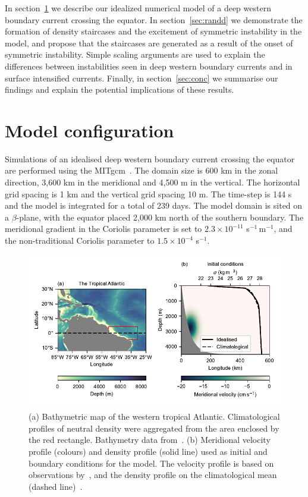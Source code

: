 In section~\ref{sec:methods} we describe our idealized numerical model of a deep western boundary current crossing the equator. In section~\ref{sec:randd} we demonstrate the formation of density staircases and the excitement of symmetric instability in the model, and propose that the staircases are generated as a result of the onset of symmetric instability. Simple scaling arguments are used to explain the differences between instabilities seen in deep western boundary currents and in surface intensified currents. Finally, in section~\ref{sec:conc} we summarise our findings and explain the potential implications of these results.

\section{Model configuration}
\label{sec:methods}
Simulations of an idealised deep western boundary current crossing the equator are performed using the MITgcm~\citep{Marshall1997}. The domain size is 600 km in the zonal direction, 3,600 km in the meridional and 4,500 m in the vertical. The horizontal grid spacing is 1 km and the vertical grid spacing 10 m. The time-step is 144 s and the model is integrated for a total of 239 days. The model domain is sited on a $\beta$-plane, with the equator placed 2,000 km north of the southern boundary. The meridional gradient in the Coriolis parameter is set to $2.3 \times 10^{-11}$ s$^{-1}\,$m$^{-1}$, and the non-traditional Coriolis parameter to $1.5 \times 10^{-4}$ s$^{-1}$.

\begin{figure}[ht!]
    \centering
    \includegraphics[width=\textwidth]{../figures/Figure1.pdf}
    \caption{(a) Bathymetric map of the western tropical Atlantic. Climatological profiles of neutral density were aggregated from the area enclosed by the red rectangle. Bathymetry data from~\citet{GEBCO2020}. (b) Meridional velocity profile (colours) and density profile (solid line) used as initial and boundary conditions for the model. The velocity profile is based on observations by~\citet{Schott2005}, and the density profile on the climatological mean (dashed line)~\citep{WOA2018}.}
    \label{fig:fig1}
\end{figure}

